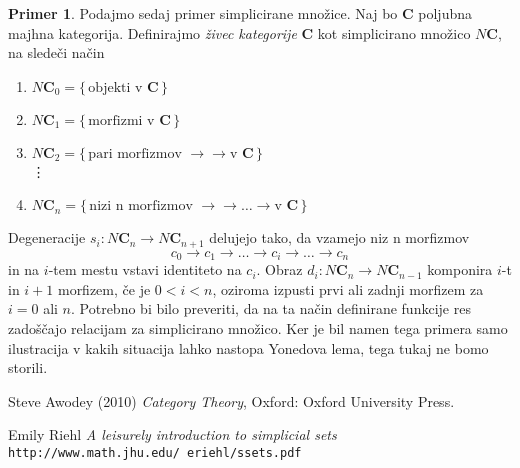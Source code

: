 \documentclass[12pt,a4paper]{book}
\theoremstyle{definition}
\theoremstyle{plain}
\theoremstyle{definition}
\newtheorem{primer}{Primer}[section]
\theoremstyle{remark}
\newcommand{\cat}[1]{\textbf{#1}}
\renewcommand{\set}[1]{\{\,#1\,\}}
\begin{document}
\begin{primer}
Podajmo sedaj primer simplicirane množice. Naj bo $\cat{C}$ poljubna majhna kategorija. Definirajmo \emph{živec kategorije} $\cat{C}$ kot simplicirano množico $N\cat{C}$, na sledeči način

\begin{enumerate}[label={}]
\item $N\cat{C}_0 = \set{\text{objekti v } \cat{C}}$
\item $N\cat{C}_1 = \set{\text{morfizmi v } \cat{C}}$
\item $N\cat{C}_2 = \set{\text{pari morfizmov } \rightarrow\rightarrow \text{v } \cat{C}}$ \\ %
\vdots
\item $N\cat{C}_n = \set{\text{nizi n morfizmov } \rightarrow\rightarrow\ldots\rightarrow \text{v } \cat{C}}$
\end{enumerate}
Degeneracije $s_i:N\cat{C}_n \to N\cat{C}_{n+1}$ delujejo tako, da vzamejo niz n morfizmov
$$ c_0 \rightarrow c_1 \rightarrow \ldots \rightarrow c_i \rightarrow \ldots \rightarrow c_n$$
in na $i$-tem mestu vstavi identiteto na $c_i$. Obraz $d_i : N\cat{C}_n \to N\cat{C}_{n-1}$ komponira $i$-t in $i+1$ morfizem, če je $0 < i < n$, oziroma izpusti prvi ali zadnji morfizem za $i = 0$ ali $n$.
Potrebno bi bilo preveriti, da na ta način definirane funkcije res zadoščajo relacijam za simplicirano množico. Ker je bil namen tega primera samo ilustracija v kakih situacija lahko nastopa Yonedova lema, tega tukaj ne bomo storili.
\end{primer}

\begin{thebibliography}{9}

Steve Awodey (2010)
\textit{Category Theory},
Oxford: Oxford University Press.

Emily Riehl
\textit{A leisurely introduction to simplicial sets}
\\\texttt{http://www.math.jhu.edu/~eriehl/ssets.pdf}
\end{thebibliography}
\end{document}
